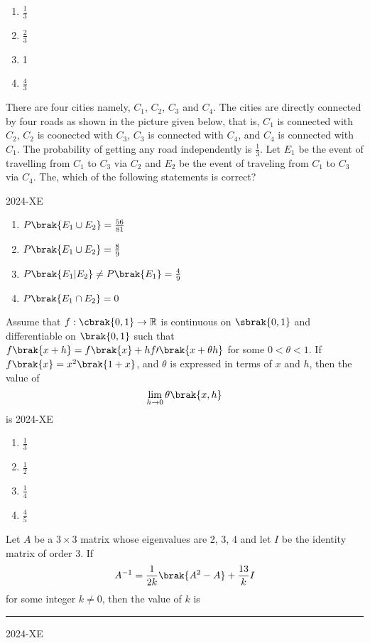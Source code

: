 		\begin{enumerate}
			\item $\frac{1}{3}$
			\item $\frac{2}{3}$
			\item 1
			\item $\frac{4}{3}$
		\end{enumerate}

\item There are four cities namely, $C_1$, $C_2$, $C_3$ and $C_4$. The cities are directly connected by four roads as shown in the picture given below, that is, $C_1$ is connected with $C_2$, $C_2$ is coonected with $C_3$, $C_3$ is connected with $C_4$, and $C_4$ is connected with $C_1$. The probability of getting any road independently is $\frac{1}{3}$. Let $E_1$ be the event of travelling from $C_1$ to $C_3$ via $C_2$ and $E_2$ be the event of traveling from $C_1$ to $C_3$ via $C_4$. The, which of the following statements is correct?
	\begin{figure}[ht]
		\centering
		
	\end{figure}
\hfill{2024-XE}

		\begin{enumerate}
			\item $P\brak{E_1 \cup E_2} = \frac{56}{81}$
			\item $P\brak{E_1 \cup E_2}= \frac{8}{9}$
			\item $P\brak{E_1 \vert E_2} \neq P\brak{E_1}=\frac{4}{9}$
			\item $P\brak{E_1 \cap E_2} = 0$
		\end{enumerate}
\newpage
	\item Assume that $f:\cbrak{0,1} \to \mathbb{R}$ is continuous on $\sbrak{0,1}$ and differentiable on $\brak{0,1}$ such that $f\brak{x+h}=f\brak{x}+hf\prime \brak{x+\theta h}$ for some $0< \theta <1$. If $f\brak{x}=x^2\brak{1+x}$, and $\theta$ is expressed in terms of $x$ and $h$, then the value of 
		$$ \lim _{h \to 0} \theta \brak{x,h}$$ is
\hfill{2024-XE}

		\begin{enumerate}
			\item $\frac{1}{3}$
			\item $\frac{1}{2}$
			\item $\frac{1}{4}$
			\item $\frac{4}{5}$
		\end{enumerate}

\item Let $A$ be a $3 \times 3$ matrix whose eigenvalues are 2, 3, 4 and let $I$ be the identity matrix of order 3. If
	$$ A^{-1}=\frac{1}{2k} \brak{A^2 -A} + \frac{13}{k} I$$
		for some integer $k \neq 0$, then the value of $k$ is \rule{1cm}{0.2pt}
\hfill{2024-XE}


